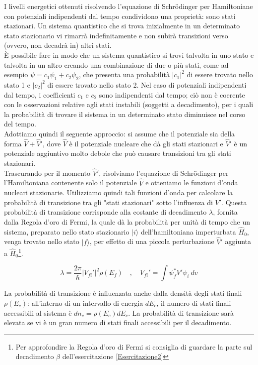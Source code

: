 I livelli energetici ottenuti risolvendo l'equazione di Schrödinger per Hamiltoniane con potenziali indipendenti dal tempo condividono una proprietà: sono stati stazionari. 
Un sistema quantistico che si trova inizialmente in un determinato stato stazionario vi rimarrà indefinitamente e non subirà transizioni verso (ovvero, non decadrà in) altri stati. \\
È possibile fare in modo che un sistema quantistico si trovi talvolta in uno stato e talvolta in un altro creando una combinazione di due o più stati, come ad esempio $\psi = c_1\psi_1 + c_2\psi_2$, che presenta una probabilità $|c_1|^2$ di essere trovato nello stato 1 e $|c_2|^2$ di essere trovato nello stato 2. Nel caso di potenziali indipendenti dal tempo, i coefficienti $c_1$ e $c_2$ sono indipendenti dal tempo; ciò non è coerente con le osservazioni relative agli stati instabili (soggetti a decadimento), per i quali la probabilità di trovare il sistema in un determinato stato diminuisce nel corso del tempo.\\

Adottiamo quindi il seguente approccio: si assume che il potenziale sia della forma $\hat{V} + \hat{V}'$, dove $\hat{V}$ è il potenziale nucleare che dà gli stati stazionari e $\hat{V}'$ è un potenziale aggiuntivo molto debole che può causare transizioni tra gli stati stazionari. \\
Trascurando per il momento $\hat{V}'$, risolviamo l'equazione di Schrödinger per l'Hamiltoniana contenente solo il potenziale $\hat{V}$ e otteniamo le funzioni d'onda nucleari stazionarie. Utilizziamo quindi tali funzioni d'onda per calcolare la probabilità di transizione tra gli "stati stazionari" sotto l'influenza di $V'$. Questa probabilità di transizione corrisponde alla costante di decadimento $\lambda$, fornita dalla Regola d'oro di Fermi, la quale dà la probabilità per unità di tempo che un sistema, preparato nello stato stazionario $|i\rangle$ dell’hamiltoniana imperturbata $\hat{H}_0$, venga trovato nello stato $|f\rangle$, per effetto di una piccola perturbazione $\hat{V}'$ aggiunta a $\hat{H}_0$\footnote{Per approfondire la Regola d'oro di Fermi si consiglia di guardare la parte sul decadimento $\beta$ dell'esercitazione \ref{Esercitazione2}}.
%
\begin{tcolorbox}[colback=black!5!white, colframe=black!45!white, boxrule=0.8pt]
\begin{equation}
    \lambda = \frac{2\pi}{\hbar}|V_{fi}'|^2 \rho(E_f) \quad , \quad V_{fi}' = \int \psi_f^* V' \psi_i \ dv
\end{equation}
\end{tcolorbox}
La probabilità di transizione è influenzata anche dalla densità degli stati finali $\rho(E_c)$: all'interno di un intervallo di energia $dE_c$, il numero di stati finali accessibili al sistema è $dn_c = \rho(E_c) dE_c$. La probabilità di transizione sarà elevata se vi è un gran numero di stati finali accessibili per il decadimento.

